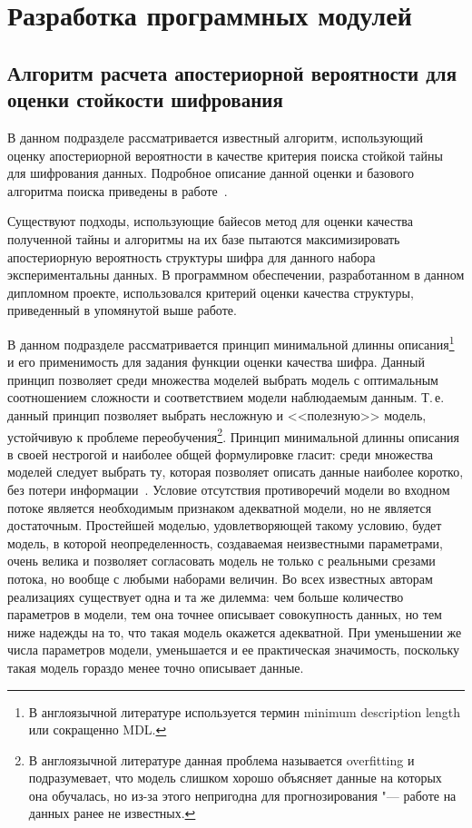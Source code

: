 \section{Разработка программных модулей}
\label{sec:develop_modules}

\subsection{Алгоритм расчета апостериорной вероятности для оценки стойкости шифрования}
\label{sub:develop_modules:k2_algorithm}

В данном подразделе рассматривается известный алгоритм, использующий оценку апостериорной вероятности в качестве критерия поиска стойкой тайны для шифрования данных.
Подробное описание данной оценки и базового алгоритма поиска приведены в работе~\cite{Cooper1991}.

Существуют подходы, использующие байесов метод для оценки качества полученной тайны и алгоритмы на их базе пытаются максимизировать апостериорную вероятность структуры шифра для данного набора экспериментальны данных.
В программном обеспечении, разработанном в данном дипломном проекте, использовался критерий оценки качества структуры, приведенный в упомянутой выше работе.

В данном подразделе рассматривается принцип минимальной длинны описания\footnote{В англоязычной литературе используется термин minimum description length или сокращенно MDL.} и его применимость для задания функции оценки качества шифра.
Данный принцип позволяет среди множества моделей выбрать модель с оптимальным соотношением сложности и соответствием модели наблюдаемым данным.
Т.\,е. данный принцип позволяет выбрать несложную и <<полезную>> модель, устойчивую к проблеме переобучения\footnote{В англоязычной литературе данная проблема называется overfitting и подразумевает, что модель слишком хорошо объясняет данные на которых она обучалась, но из-за этого непригодна для прогнозирования "--- работе на данных ранее не известных.}.
Принцип минимальной длинны описания в своей нестрогой и наиболее общей формулировке гласит: среди множества моделей следует выбрать ту, которая позволяет описать данные наиболее коротко, без потери информации~\cite{Grunwald05atutorial}.
Условие отсутствия противоречий модели во входном потоке является необходимым признаком адекватной модели, но не является достаточным. Простейшей моделью, удовлетворяющей такому условию, будет модель, в которой неопределенность, создаваемая неизвестными параметрами, очень велика и позволяет согласовать модель не только с реальными срезами потока, но вообще с любыми наборами величин. Во всех известных авторам реализациях существует одна и та же дилемма: чем больше количество параметров в модели, тем она точнее описывает совокупность данных, но тем ниже надежды на то, что такая модель окажется адекватной. При уменьшении же числа параметров модели, уменьшается и ее практическая значимость, поскольку такая модель гораздо менее точно описывает данные.

